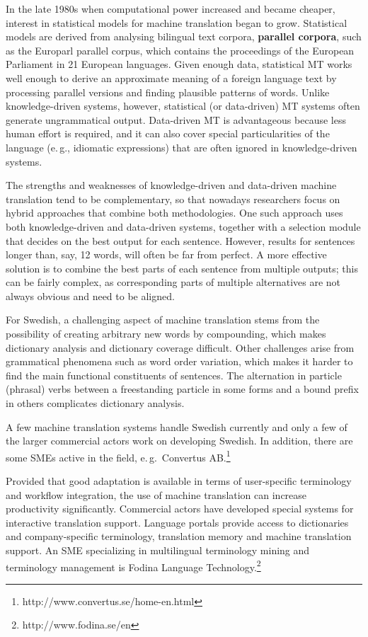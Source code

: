 \begin{multicols}{2}
In the late 1980s when computational power increased and became cheaper, interest in statistical models for machine translation began to grow. Statistical models are derived from analysing bilingual text corpora, \textbf{parallel corpora}, such as the Europarl parallel corpus, which contains the proceedings of the European Parliament in 21 European languages. Given enough data, statistical MT works well enough to derive an approximate meaning of a foreign language text by processing parallel versions and finding plausible patterns of words. Unlike knowledge-driven systems, however, statistical (or data-driven) MT systems often generate ungrammatical output. Data-driven MT is advantageous because less human effort is required, and it can also cover special particularities of the language (e.\,g., idiomatic expressions) that are often ignored in knowledge-driven systems. 

The strengths and weaknesses of knowledge-driven and data-driven machine translation tend to be complementary, so that nowadays researchers focus on hybrid approaches that combine both methodologies. One such approach uses both knowledge-driven and data-driven systems, together with a selection module that decides on the best output for each sentence. However, results for sentences longer than, say, 12 words, will often be far from perfect. A more effective solution is to combine the best parts of each sentence from multiple outputs; this can be fairly complex, as corresponding parts of multiple alternatives are not always obvious and need to be aligned. 


For Swedish, a challenging aspect of machine translation stems from
the possibility of creating arbitrary new words by compounding, which
makes dictionary analysis and dictionary coverage difficult. Other
challenges arise from grammatical phenomena such as word order
variation, which makes it harder to find the main functional
constituents of sentences. The alternation in particle (phrasal)
verbs between a freestanding particle in some forms and a bound prefix
in others complicates dictionary analysis.

A few machine translation systems handle Swedish currently and only a few of the larger commercial actors work on developing Swedish. In addition, there are some SMEs active in the field, e.\,g.~Convertus AB.\footnote{http://www.convertus.se/home-en.html}

Provided that good adaptation is available in terms of user-specific
terminology and workflow integration, the use of machine translation
can increase productivity significantly. Commercial actors have
developed special systems for interactive translation
support. Language portals provide access to dictionaries and
company-specific terminology, translation memory and machine
translation support. An SME specializing in multilingual terminology
mining and terminology management is Fodina
Language Technology.\footnote{http://www.fodina.se/en}


\end{multicols}
